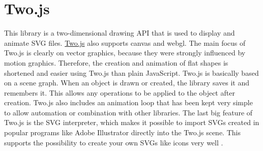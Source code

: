 \section{Two.js}
\label{sec:tecTwo}
This library is a two-dimensional drawing API that is used to display and animate SVG files. \href{https://two.js.org/}{Two.js} also supports canvas and webgl. The main focus of Two.js is clearly on vector graphics, because they were strongly influenced by motion graphics. Therefore, the creation and animation of flat shapes is shortened and easier using Two.js than plain JavaScript. Two.js is basically based on a scene graph. When an object is drawn or created, the library saves it and remembers it. This allows any operations to be applied to the object after creation. Two.js also includes an animation loop that has been kept very simple to allow automation or combination with other libraries. The last big feature of Two.js is the SVG interpreter, which makes it possible to import SVGs created in popular programs like Adobe Illustrator directly into the Two.js scene. This supports the possibility to create your own SVGs like icons very well \cite{TwoJsAuthors2019}. 

